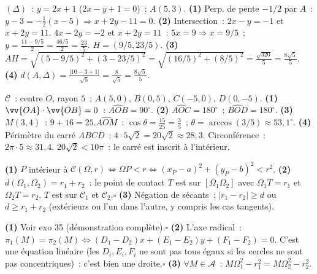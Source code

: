 
$(\Delta)$~: $y=2x+1$ ($2x-y+1=0$)~; $A(5,3)$.
\textbf{(1)} Perp. de pente $-1/2$ par $A$~: $y-3=-\frac{1}{2}(x-5)\Rightarrow x+2y-11=0$.
\textbf{(2)} Intersection~: $2x-y=-1$ et $x+2y=11$.
$4x-2y=-2$ et $x+2y=11$~: $5x=9\Rightarrow x=9/5$~; $y=\frac{11-9/5}{2}=\frac{46/5}{2}=\frac{23}{5}$.
$H=(9/5,23/5)$.
\textbf{(3)} $AH=\sqrt{(5-9/5)^2+(3-23/5)^2}=\sqrt{(16/5)^2+(8/5)^2}=\frac{\sqrt{320}}{5}=\frac{8\sqrt{5}}{5}$.
\textbf{(4)} $d(A,\Delta)=\frac{|10-3+1|}{\sqrt{5}}=\frac{8}{\sqrt{5}}=\frac{8\sqrt{5}}{5}$.\checkmark


$\mathcal{C}$~: centre $O$, rayon $5$~; $A(5,0)$, $B(0,5)$, $C(-5,0)$, $D(0,-5)$.
\textbf{(1)} $\vv{OA}\cdot\vv{OB}=0$~: $\widehat{AOB}=90^{\circ}$.
\textbf{(2)} $\widehat{AOC}=180^{\circ}$~; $\widehat{BOD}=180^{\circ}$.
\textbf{(3)} $M(3,4)$~: $9+16=25$.\checkmark\quad $\widehat{AOM}$~: $\cos\theta=\frac{15}{25}=\frac{3}{5}$~; $\theta=\arccos(3/5)\approx53{,}1^{\circ}$.
\textbf{(4)} P\'erim\`etre du carr\'e $ABCD$~: $4\cdot5\sqrt{2}=20\sqrt{2}\approx28{,}3$.
Circonf\'erence~: $2\pi\cdot5\approx31{,}4$. $20\sqrt{2}<10\pi$~: le carr\'e est inscrit \`a l'int\'erieur.


\textbf{(1)} $P$ int\'erieur \`a $\mathcal{C}(\Omega,r)\Leftrightarrow\Omega P<r\Leftrightarrow(x_P-a)^2+(y_P-b)^2<r^2$.
\textbf{(2)} $d(\Omega_1,\Omega_2)=r_1+r_2$~: le point de contact $T$ est sur $[\Omega_1\Omega_2]$
avec $\Omega_1T=r_1$ et $\Omega_2T=r_2$. $T$ est sur $\mathcal{C}_1$ et $\mathcal{C}_2$.\hfill$\square$
\textbf{(3)} N\'egation de \og s\'ecants\fg~: $|r_1-r_2|\geq d$ ou $d\geq r_1+r_2$
(ext\'erieurs ou l'un dans l'autre, y compris les cas tangents).


\textbf{(1)} Voir exo 35 (d\'emonstration compl\`ete).\hfill$\square$
\textbf{(2)} L'axe radical~: $\pi_1(M)=\pi_2(M)\Leftrightarrow(D_1-D_2)x+(E_1-E_2)y+(F_1-F_2)=0$.
C'est une \'equation lin\'eaire (les $D_i,E_i,F_i$ ne sont pas tous \'egaux si les cercles ne sont pas concentriques)~: c'est bien une droite.\hfill$\square$
\textbf{(3)} $\forall M\in\mathcal{A}$~: $M\Omega_1^2-r_1^2=M\Omega_2^2-r_2^2$.

